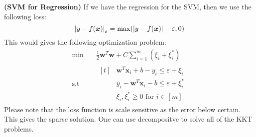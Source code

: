 \begin{remark}{\textbf{(SVM for Regression)}}
    If we have the regression for the SVM, then we use the following loss:
    \begin{equation*}
        \left| y - f(\boldsymbol x) \right|_\varepsilon = \max(\left| y - f(\boldsymbol x) \right| - \varepsilon, 0)
    \end{equation*}
    This would gives the following optimization problem:
    \begin{equation*}
    \begin{aligned}
        \min & \quad \frac{1}{2}\boldsymbol w^T\boldsymbol w + C\sum^m_{i=1}(\xi_i + \xi_i^*) \\
        \text{s.t}& \quad \begin{aligned}[t]
            &\boldsymbol w^T\boldsymbol x_i + b - y_i \le \varepsilon + \xi_i \\
            &y_i-\boldsymbol w^T\boldsymbol x_i - b \le \varepsilon + \xi_i^* \\
            &\xi_i,\xi_i^* \ge 0 \text{ for } i \in [m]
        \end{aligned}
    \end{aligned}
    \end{equation*} 
    Please note that the loss function is scale sensitive as the error below certain. This gives the sparse solution. One can use decompositve to solve all of the KKT problems.
\end{remark}



